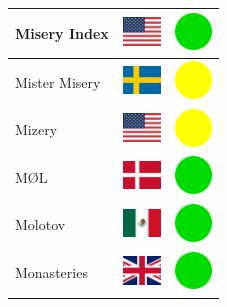 \documentclass[12pt, a4paper, twoside]{report}
\begin{document}
\begin{center}
\begin{longtable}{|p{5cm}|p{2cm}|p{2cm}|}
 Misery Index                                               & \includegraphics[width=1cm]{../img/flags/us} &   \includegraphics[width=1cm]{../likes/y} \\ \hline
 Mister Misery                                              & \includegraphics[width=1cm]{../img/flags/se} &   \includegraphics[width=1cm]{../likes/m} \\ \hline
 Mizery                                                     & \includegraphics[width=1cm]{../img/flags/us} &   \includegraphics[width=1cm]{../likes/m} \\ \hline
 MØL                                                        & \includegraphics[width=1cm]{../img/flags/dk} &   \includegraphics[width=1cm]{../likes/y} \\ \hline
 Molotov                                                    & \includegraphics[width=1cm]{../img/flags/mx} &   \includegraphics[width=1cm]{../likes/y} \\ \hline
 Monasteries                                                & \includegraphics[width=1cm]{../img/flags/gb} &   \includegraphics[width=1cm]{../likes/y} \\ \hline

\end{longtable}
\end{center}
\end{document}
